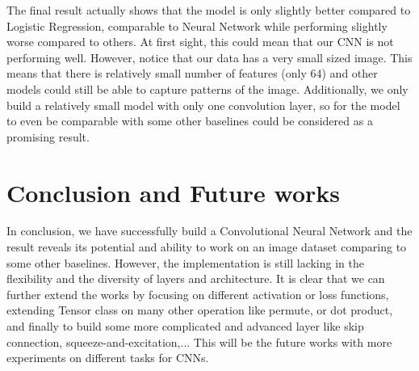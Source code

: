 \documentclass[conference]{IEEEtran}
\begin{document}
The final result actually shows that the model is only slightly better compared to Logistic Regression, comparable to Neural Network while performing slightly worse compared to others. At first sight, this could mean that our CNN is not performing well. However, notice that our data has a very small sized image. This means that there is relatively small number of features (only 64) and other models could still be able to capture patterns of the image. Additionally, we only build a relatively small model with only one convolution layer, so for the model to even be comparable with some other baselines could be considered as a promising result.

\section{Conclusion and Future works}
In conclusion, we have successfully build a Convolutional Neural Network and the result reveals its potential and ability to work on an image dataset comparing to some other baselines. However, the implementation is still lacking in the flexibility and the diversity of layers and architecture. It is clear that we can further extend the works by focusing on different activation or loss functions, extending Tensor class on many other operation like permute, or dot product, and finally to build some more complicated and advanced layer like skip connection, squeeze-and-excitation,... This will be the future works with more experiments on different tasks for CNNs.
\end{document}
